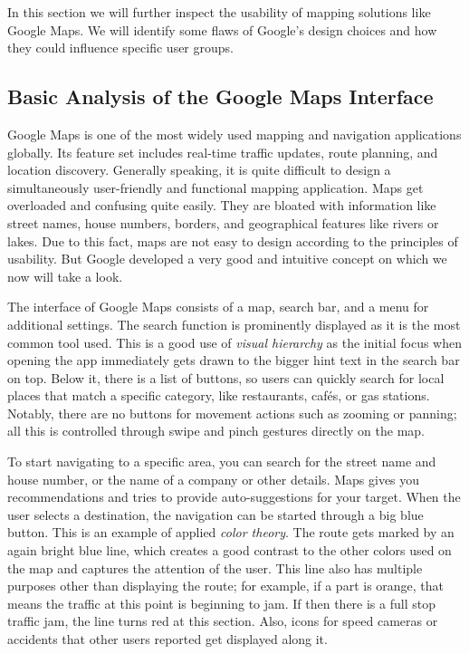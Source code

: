 \Author{\daAuthorTwo}

In this section we will further inspect the usability of mapping solutions like Google Maps. We will identify some flaws of Google's design choices and how they could influence specific user groups.

\blankLine

\subsection{Basic Analysis of the Google Maps Interface}

Google Maps is one of the most widely used mapping and navigation applications globally. Its feature set includes real-time traffic updates, route planning, and location discovery. Generally speaking, it is quite difficult to design a simultaneously user-friendly and functional mapping application. Maps get overloaded and confusing quite easily. They are bloated with information like street names, house numbers, borders, and geographical features like rivers or lakes. Due to this fact, maps are not easy to design according to the principles of usability. But Google developed a very good and intuitive concept on which we now will take a look.

\blankLine

The interface of Google Maps consists of a map, search bar, and a menu for additional settings. The search function is prominently displayed as it is the most common tool used. This is a good use of \textit{visual hierarchy} as the initial focus when opening the app immediately gets drawn to the bigger hint text in the search bar on top. Below it, there is a list of buttons, so users can quickly search for local places that match a specific category, like restaurants, cafés, or gas stations. Notably, there are no buttons for movement actions such as zooming or panning; all this is controlled through swipe and pinch gestures directly on the map. \autocite{battersby2008user}

\blankLine

To start navigating to a specific area, you can search for the street name and house number, or the name of a company or other details. Maps gives you recommendations and tries to provide auto-suggestions for your target. When the user selects a destination, the navigation can be started through a big blue button. This is an example of applied \textit{color theory}. The route gets marked by an again bright blue line, which creates a good contrast to the other colors used on the map and captures the attention of the user. This line also has multiple purposes other than displaying the route; for example, if a part is orange, that means the traffic at this point is beginning to jam. If then there is a full stop traffic jam, the line turns red at this section. Also, icons for speed cameras or accidents that other users reported get displayed along it.

